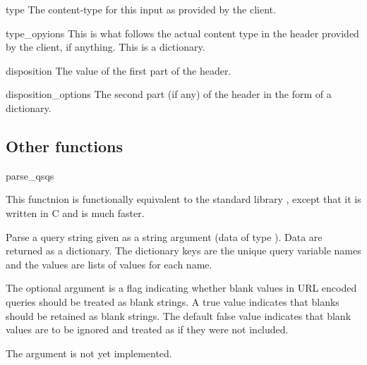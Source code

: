 \begin{memberdesc}{type}
The content-type for this input as provided by the client.
\end{memberdesc}

\begin{memberdesc}{type_opyions}
This is what follows the actual content type in the 
header provided by the client, if anything. This is a dictionary.
\end{memberdesc}

\begin{memberdesc}{disposition}
The value of the first part of the  header.
\end{memberdesc}

\begin{memberdesc}{disposition_options}
The second part (if any) of the  header in
the form of a dictionary.
\end{memberdesc}

\begin{seealso}
\end{seealso}

\subsection{Other functions\label{pyapi-util-funcs}}

\begin{funcdesc}{parse_qs}{qs}

This functnion is functionally equivalent to the standard library
 , except that it is written in C and is
much faster. 

Parse a query string given as a string argument (data of type
).  Data are
returned as a dictionary.  The dictionary keys are the unique query
variable names and the values are lists of values for each name.

The optional argument  is a flag indicating
whether blank values in URL encoded queries should be treated as blank
strings.  A true value indicates that blanks should be retained as
blank strings.  The default false value indicates that blank values
are to be ignored and treated as if they were not included.

 The  argument is not yet implemented.

\end{funcdesc}


